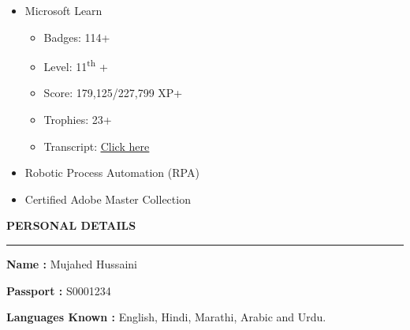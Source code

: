 \documentclass[a4paper]{article}
\begin{document}
\begin{itemize}
  \item
    Microsoft Learn
  
    \begin{itemize}
    \item Badges: 114+
    \item Level: 11\textsuperscript{th} +
    \item Score: 179,125/227,799 XP+
    \item Trophies: 23+
    \item Transcript: \href{https://learn.microsoft.com/en-gb/users/mujahedh/transcript/d8k4jb84x69nm62}{\ul{Click here}}
    \end{itemize}
  
  \item
    Robotic Process Automation (RPA)
  \item
    Certified Adobe Master Collection
\end{itemize}

\begin{center}
  \textbf{PERSONAL DETAILS}
  \rule{\textwidth}{0.4pt}  %
\end{center}

\textbf{Name :} Mujahed Hussaini

\textbf{Passport :} S0001234

\textbf{Languages Known :} English, Hindi, Marathi, Arabic and Urdu.
\end{document}
